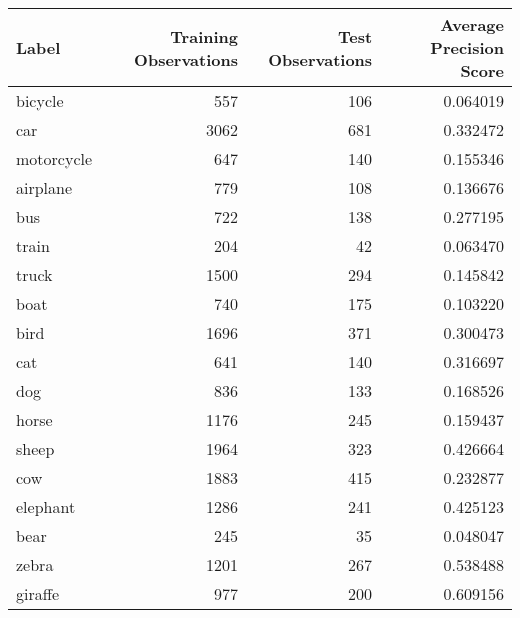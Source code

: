 \begin{tabular}{lrrr}
\toprule
      Label &  Training Observations &  Test Observations &  Average Precision Score \\
\midrule
    bicycle &                    557 &                106 &                 0.064019 \\
        car &                   3062 &                681 &                 0.332472 \\
 motorcycle &                    647 &                140 &                 0.155346 \\
   airplane &                    779 &                108 &                 0.136676 \\
        bus &                    722 &                138 &                 0.277195 \\
      train &                    204 &                 42 &                 0.063470 \\
      truck &                   1500 &                294 &                 0.145842 \\
       boat &                    740 &                175 &                 0.103220 \\
       bird &                   1696 &                371 &                 0.300473 \\
        cat &                    641 &                140 &                 0.316697 \\
        dog &                    836 &                133 &                 0.168526 \\
      horse &                   1176 &                245 &                 0.159437 \\
      sheep &                   1964 &                323 &                 0.426664 \\
        cow &                   1883 &                415 &                 0.232877 \\
   elephant &                   1286 &                241 &                 0.425123 \\
       bear &                    245 &                 35 &                 0.048047 \\
      zebra &                   1201 &                267 &                 0.538488 \\
    giraffe &                    977 &                200 &                 0.609156 \\
\bottomrule
\end{tabular}
